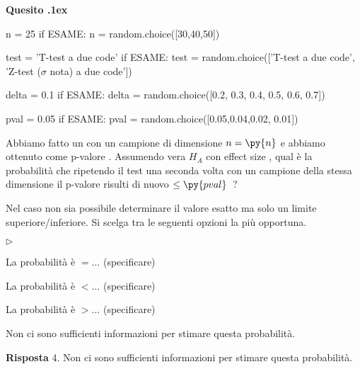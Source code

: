 \documentclass[11pt,twoside,a4paper]{article}
\newcommand{\mylabel}[1]{#1\hfill}
\renewenvironment{itemize}
  {\begin{list}{$\triangleright$}{%
   \setlength{\parskip}{0mm}
   \setlength{\topsep}{.4\baselineskip}
   \setlength{\rightmargin}{0mm}
   \setlength{\listparindent}{0mm}
   \setlength{\itemindent}{0mm}
   \setlength{\labelwidth}{2ex}
   \setlength{\itemsep}{.4\baselineskip}
   \setlength{\parsep}{0mm}
   \setlength{\partopsep}{0mm}
   \setlength{\labelsep}{1ex}
   \setlength{\leftmargin}{\labelwidth+\labelsep}
   \let\makelabel\mylabel}}{%
   \end{list}\vspace*{-1.3mm}}
\newcounter{quesito}
\newenvironment{question}{\bigskip\addtocounter{quesito}{1}\par\textbf{Quesito \thequesito.\kern1ex}}{\vspace{\parskip}}
\newenvironment{answer}{\par\textbf{Risposta\quad}}{\vspace{\parskip}}
\begin{document}
\begin{question} %
\begin{pycode}
n = 25
if ESAME: n = random.choice([30,40,50])

test = 'T-test a due code'
if ESAME: test = random.choice(['T-test a due code', 'Z-test ($\sigma$ nota) a due code'])

delta = 0.1
if ESAME: delta = random.choice([0.2, 0.3, 0.4, 0.5, 0.6, 0.7])

pval = 0.05
if ESAME: pval = random.choice([0.05,0.04,0.02, 0.01])
\end{pycode}
Abbiamo fatto un  con un campione di dimensione $n=\py{n}$ e abbiamo ottenuto come p-valore .
Assumendo vera $H_A$ con effect size , qual è la probabilità che ripetendo il test una seconda volta con un campione della stessa dimensione il p-valore risulti di nuovo $\le\py{pval}$~?

Nel caso non sia possibile determinare il valore esatto ma solo un limite superiore/inferiore. Si scelga tra le seguenti opzioni la più opportuna.
\begin{itemize}
\item[1.] La probabilità è $=\dots$ (specificare)
\item[2.] La probabilità è $<\dots$ (specificare)
\item[3.] La probabilità è $>\dots$ (specificare)
\item[4.] Non ci sono sufficienti informazioni per stimare questa probabilità.
\end{itemize}
\begin{answer}
{\color{blue}4. Non ci sono sufficienti informazioni per stimare questa probabilità.}
\end{answer}
\end{question}
\end{document}
